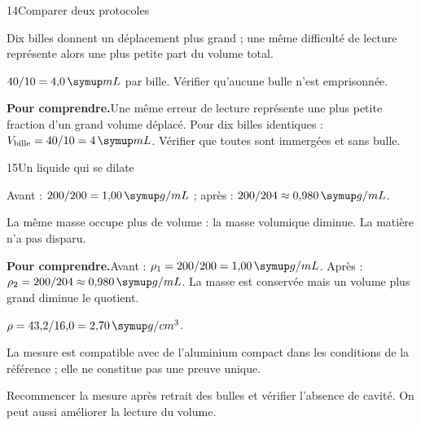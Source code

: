 \par\noindent\begin{minipage}{\linewidth}
\begin{corrige}{14}{Comparer deux protocoles}
\begin{questions}
\item Dix billes donnent un déplacement plus grand ; une même difficulté de lecture représente alors une plus petite part du volume total.
\item $40/10=4{,}0\unite{mL}$ par bille. Vérifier qu’aucune bulle n’est emprisonnée.
\end{questions}
\par\smallskip\noindent\textbf{Pour comprendre.}\enspace Une même erreur de lecture représente une plus petite fraction d’un grand volume déplacé. Pour dix billes identiques : $V_{\text{bille}}=40/10=4\unite{mL}$. Vérifier que toutes sont immergées et sans bulle.\par
\end{corrige}
\end{minipage}
\par\noindent\begin{minipage}{\linewidth}
\begin{corrige}{15}{Un liquide qui se dilate}
\begin{questions}
\item Avant : $200/200=1{,}00\unite{g/mL}$ ; après : $200/204\approx0{,}980\unite{g/mL}$.
\item La même masse occupe plus de volume : la masse volumique diminue. La matière n’a pas disparu.
\end{questions}
\par\smallskip\noindent\textbf{Pour comprendre.}\enspace Avant : $\rho_1=200/200=1{,}00\unite{g/mL}$. Après : $\rho_2=200/204\approx0{,}980\unite{g/mL}$. La masse est conservée mais un volume plus grand diminue le quotient.\par
\end{corrige}
\end{minipage}
\par\noindent\begin{minipage}{\linewidth}
\label{cor-defi-1}\begin{questions}
\item $\rho=43{,}2/16{,}0=2{,}70\unite{g/cm^3}$.
\item La mesure est compatible avec de l’aluminium compact dans les conditions de la référence ; elle ne constitue pas une preuve unique.
\item Recommencer la mesure après retrait des bulles et vérifier l’absence de cavité. On peut aussi améliorer la lecture du volume.
\end{questions}
\end{minipage}

